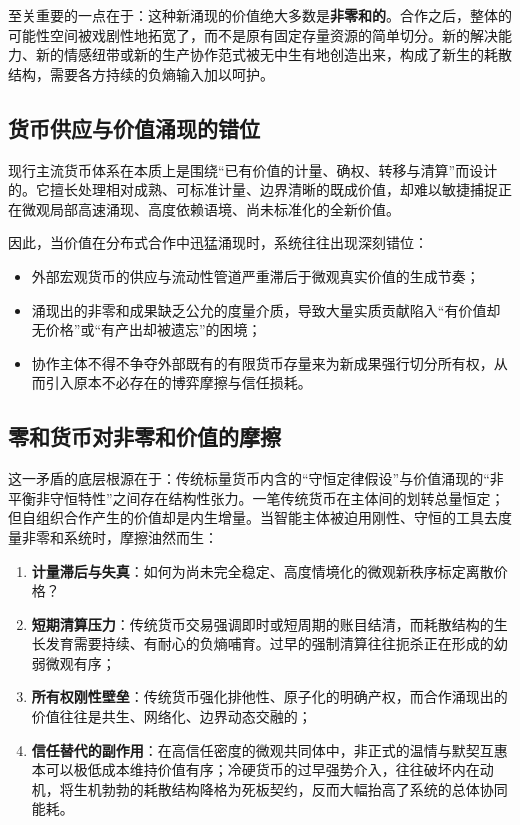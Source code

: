 \documentclass[11pt,a4paper]{ctexart}
\begin{document}
至关重要的一点在于：这种新涌现的价值绝大多数是\textbf{非零和的}。合作之后，整体的可能性空间被戏剧性地拓宽了，而不是原有固定存量资源的简单切分。新的解决能力、新的情感纽带或新的生产协作范式被无中生有地创造出来，构成了新生的耗散结构，需要各方持续的负熵输入加以呵护。

\subsection{货币供应与价值涌现的错位}
现行主流货币体系在本质上是围绕“已有价值的计量、确权、转移与清算”而设计的。它擅长处理相对成熟、可标准计量、边界清晰的既成价值，却难以敏捷捕捉正在微观局部高速涌现、高度依赖语境、尚未标准化的全新价值。

因此，当价值在分布式合作中迅猛涌现时，系统往往出现深刻错位：
\begin{itemize}
    \item 外部宏观货币的供应与流动性管道严重滞后于微观真实价值的生成节奏；
    \item 涌现出的非零和成果缺乏公允的度量介质，导致大量实质贡献陷入“有价值却无价格”或“有产出却被遗忘”的困境；
    \item 协作主体不得不争夺外部既有的有限货币存量来为新成果强行切分所有权，从而引入原本不必存在的博弈摩擦与信任损耗。
\end{itemize}

\subsection{零和货币对非零和价值的摩擦}
这一矛盾的底层根源在于：传统标量货币内含的“守恒定律假设”与价值涌现的“非平衡非守恒特性”之间存在结构性张力。一笔传统货币在主体间的划转总量恒定；但自组织合作产生的价值却是内生增量。当智能主体被迫用刚性、守恒的工具去度量非零和系统时，摩擦油然而生：
\begin{enumerate}
    \item \textbf{计量滞后与失真}：如何为尚未完全稳定、高度情境化的微观新秩序标定离散价格？
    \item \textbf{短期清算压力}：传统货币交易强调即时或短周期的账目结清，而耗散结构的生长发育需要持续、有耐心的负熵哺育。过早的强制清算往往扼杀正在形成的幼弱微观有序；
    \item \textbf{所有权刚性壁垒}：传统货币强化排他性、原子化的明确产权，而合作涌现出的价值往往是共生、网络化、边界动态交融的；
    \item \textbf{信任替代的副作用}：在高信任密度的微观共同体中，非正式的温情与默契互惠本可以极低成本维持价值有序；冷硬货币的过早强势介入，往往破坏内在动机，将生机勃勃的耗散结构降格为死板契约，反而大幅抬高了系统的总体协同能耗。
\end{enumerate}
\end{document}

